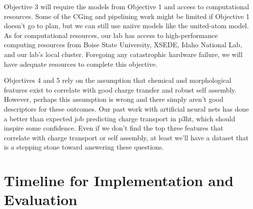 Objective 3 will require the models from Objective 1 and access to computational resources.
Some of the CGing and pipelining work might be limited if Objective 1 doesn't go to plan, but we can still use naiive models like the united-atom model.
As for computational resources, our lab has access to high-performance computing resources from Boise State University, XSEDE, Idaho National Lab, and our lab's local cluster.
Foregoing any catastrophic hardware failure, we will have adequate resources to complete this objective.

Objectives 4 and 5 rely on the assumption that chemical and morphological features exist to correlate with good charge transfer and robust self assembly.
However, perhaps this assumption is wrong and there simply aren't good descriptors for these outcomes.
Our past work with artificial neural nets has done a better than expected job predicting charge transport in p3ht, which should inspire some confidence.
Even if we don't find the top three features that correlate with charge transport or self assembly, at least we'll have a dataset that is a stepping stone toward answering these questions.

\section*{Timeline for Implementation and Evaluation}

